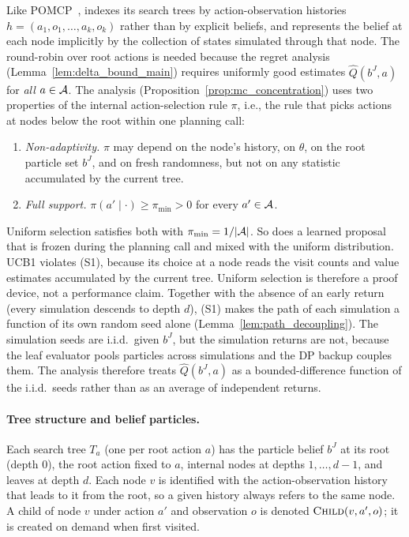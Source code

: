 Like POMCP~\citep{silver2010monte},  indexes its search trees by action-observation histories $h=(a_1,o_1,\ldots,a_k,o_k)$ rather than by explicit beliefs, and represents the belief at each node implicitly by the collection of states simulated through that node.
The round-robin over root actions is needed because the regret analysis (Lemma~\ref{lem:delta_bound_main}) requires uniformly good estimates $\widehat Q(b^J,a)$ for \emph{all} $a\in{\mathcal{A}}$.
The analysis (Proposition~\ref{prop:mc_concentration}) uses two properties of the internal action-selection rule $\pi$, i.e., the rule that picks actions at nodes below the root within one planning call:
\begin{enumerate}
\item[(S1)] \emph{Non-adaptivity.} $\pi$ may depend on the node's history, on $\theta$, on the root particle set $b^J$, and on fresh randomness, but not on any statistic accumulated by the current tree.
\item[(S2)] \emph{Full support.} $\pi(a'\mid\cdot)\ge\pi_{\min}>0$ for every $a'\in{\mathcal{A}}$.
\end{enumerate}
Uniform selection satisfies both with $\pi_{\min}=1/|{\mathcal{A}}|$.
So does a learned proposal that is frozen during the planning call and mixed with the uniform distribution.
UCB1 violates (S1), because its choice at a node reads the visit counts and value estimates accumulated by the current tree.
Uniform selection is therefore a proof device, not a performance claim.
Together with the absence of an early return (every simulation descends to depth $d$), (S1) makes the path of each simulation a function of its own random seed alone (Lemma~\ref{lem:path_decoupling}).
The simulation seeds are i.i.d.\ given $b^J$, but the simulation returns are not, because the leaf evaluator pools particles across simulations and the DP backup couples them.
The analysis therefore treats $\widehat Q(b^J,a)$ as a bounded-difference function of the i.i.d.\ seeds rather than as an average of independent returns.

\paragraph{Tree structure and belief particles.}
Each search tree $T_a$ (one per root action $a$) has the particle belief $b^J$ at its root (depth $0$), the root action fixed to $a$, internal nodes at depths $1,\ldots,d-1$, and leaves at depth $d$.
Each node $v$ is identified with the action-observation history that leads to it from the root, so a given history always refers to the same node.
A child of node $v$ under action $a'$ and observation $o$ is denoted $\textsc{Child}(v,a',o)$; it is created on demand when first visited.

